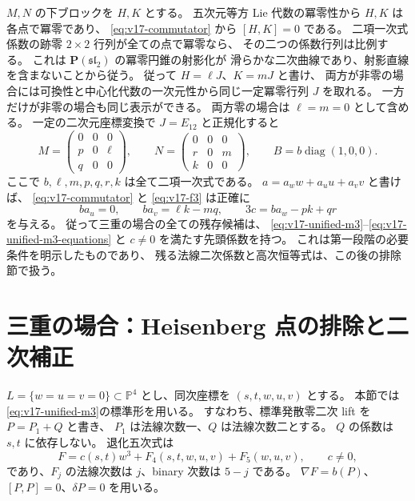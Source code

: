 \documentclass[11pt,a4paper]{ltjsarticle}
\theoremstyle{remark}\newtheorem{remark}[theorem]{注意}
\begin{document}
$M,N$ の下ブロックを $H,K$ とする。
五次元等方 Lie 代数の冪零性から $H,K$ は各点で冪零であり、
\eqref{eq:v17-commutator} から $[H,K]=0$ である。
二項一次式係数の跡零 $2\times2$ 行列が全ての点で冪零なら、
その二つの係数行列は比例する。
これは $\mathbf P(\mathfrak{sl}_2)$ の冪零円錐の射影化が
滑らかな二次曲線であり、射影直線を含まないことから従う。
従って $H=\ell J$、$K=mJ$ と書け、
両方が非零の場合には可換性と中心化代数の一次元性から同じ一定冪零行列 $J$ を取れる。
一方だけが非零の場合も同じ表示ができる。
両方零の場合は $\ell=m=0$ として含める。
一定の二次元座標変換で $J=E_{12}$ と正規化すると
\begin{equation}
 M=\begin{pmatrix}0&0&0\\p&0&\ell\\q&0&0\end{pmatrix},\qquad
 N=\begin{pmatrix}0&0&0\\r&0&m\\k&0&0\end{pmatrix},\qquad
 B=b\operatorname{diag}(1,0,0).
 \label{eq:v17-unified-m3}
\end{equation}
ここで $b,\ell,m,p,q,r,k$ は全て二項一次式である。
$a=a_w w+a_u u+a_v v$ と書けば、
\eqref{eq:v17-commutator} と \eqref{eq:v17-f3} は正確に
\begin{equation}
 b a_u=0,\qquad b a_v=\ell k-mq,\qquad
 3c=b a_w-pk+qr
 \label{eq:v17-unified-m3-equations}
\end{equation}
を与える。
従って三重の場合の全ての残存候補は、
\eqref{eq:v17-unified-m3}--\eqref{eq:v17-unified-m3-equations} と
$c\ne0$ を満たす先頭係数を持つ。
これは第一段階の必要条件を明示したものであり、
残る法線二次係数と高次恒等式は、この後の排除節で扱う。



\section{三重の場合：Heisenberg 点の排除と二次補正}
\label{sec:v18-m3}

$L=\{w=u=v=0\}\subset\mathbb P^4$ とし、同次座標を $(s,t,w,u,v)$ とする。
本節では\eqref{eq:v17-unified-m3}の標準形を用いる。
すなわち、標準発散零二次 lift を $P=P_1+Q$ と書き、
$P_1$ は法線次数一、$Q$ は法線次数二とする。
$Q$ の係数は $s,t$ に依存しない。
退化五次式は
\[
 F=c(s,t)w^3+F_4(s,t,w,u,v)+F_5(w,u,v),\qquad c\ne0,
\]
であり、$F_j$ の法線次数は $j$、binary 次数は $5-j$ である。
$\nabla F=b(P)$、$[P,P]=0$、$\delta P=0$ を用いる。
\end{document}
